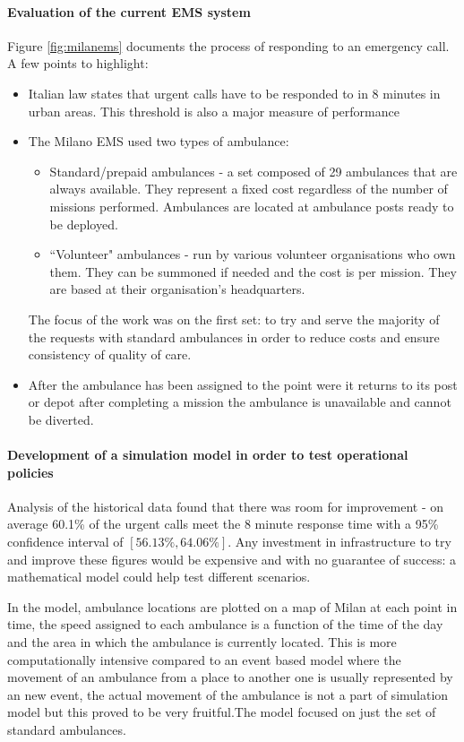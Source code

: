 \documentclass[11pt]{article} %
\begin{document}
\paragraph{Evaluation of the current EMS system }
	Figure \ref{fig:milanems} documents  the process of responding to an emergency call. A few points to highlight: 
	\begin{itemize}
		\item Italian law states that urgent calls have to be responded to in 8 minutes in urban areas. This threshold is also a major measure of performance 
		\item The Milano EMS used two types of ambulance: 
		\begin{itemize}
			\item Standard/prepaid ambulances - a set composed of 29 ambulances that are always available. They represent a fixed cost regardless of the number of missions performed. Ambulances are located at ambulance posts ready to be deployed.
			\item ``Volunteer" ambulances - run by various volunteer organisations who own them. They can be summoned if needed and the cost is per mission. They are based at their organisation's headquarters.
		\end{itemize}
		The focus of the work was on the first set: to try and serve the majority of the requests with standard ambulances in order to reduce costs and ensure consistency of quality of care. 
		\item After the ambulance has been assigned to the point were it returns to its post or depot after completing a mission the ambulance is unavailable and cannot be diverted. 
	\end{itemize}
\paragraph{Development of a simulation model in order to test operational policies }
Analysis of the historical data found that there was room for improvement - on average 60.1\% of the urgent calls meet the 8 minute response time with a 95\% confidence interval of $ [56.13\%, 64.06\%] $. Any investment in infrastructure to try and improve these figures would be expensive and with no guarantee of success: a mathematical model could help test different scenarios. 

In the model, ambulance locations are plotted on a map of Milan at each point in time, the speed assigned to each ambulance is a function of the time of the day and the area in which the ambulance is currently located. This is more  computationally intensive compared to an event based model where the movement of an ambulance from a place to another one is usually represented by an new event, the actual movement of the ambulance is not a part of simulation model but this proved to be very fruitful.The model focused on just the set of standard ambulances.
\end{document}
